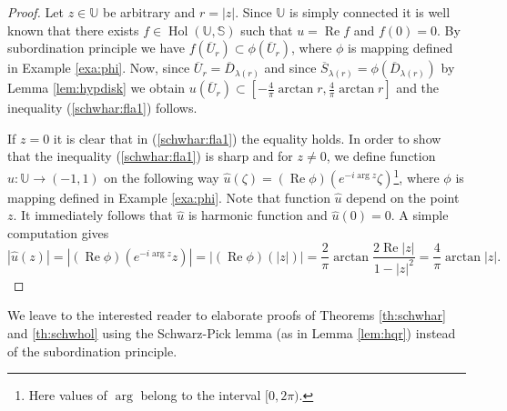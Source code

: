 \documentclass{amsart}
\newcommand{\re}{\mathop{\mathrm{Re}}}
\newcommand{\Hol}{\mathop{\mathrm{Hol}}}
\begin{document}
\begin{proof}
Let $z\in\mathbb{U}$ be arbitrary and $r=|z|$. Since $\mathbb{U}$ is simply connected it is well known that there exists $f\in\Hol(\mathbb{U},\mathbb{S})$ such that $u=\re{f}$ and $f(0)=0$. By subordination principle we have $f(\overline{U}_r)\subset\phi(\overline{U}_r)$, where $\phi$ is mapping defined in Example \ref{exa:phi}. Now, since
$\overline{U}_r=\overline{D}_{\lambda(r)}$ and since $\overline{S}_{\lambda(r)}=\phi(\overline{D}_{\lambda(r)})$  by Lemma \ref{lem:hypdisk} we obtain
$u(\overline{U}_r)\subset\displaystyle\left[-\frac{4}{\pi}\arctan{r},\frac{4}{\pi}\arctan{r}\right]$ and the inequality (\ref{schwhar:fla1}) follows.

If  $z=0$ it is clear  that in  (\ref{schwhar:fla1}) the equality holds.
In order to show that the inequality (\ref{schwhar:fla1}) is sharp and for  $z\neq0$, we  define  function  $\widehat{u}:\mathbb{U}\rightarrow(-1,1)$ on the following way $\widehat{u}(\zeta)=(\re{\phi})(e^{-i\arg{z}}\zeta)$\footnote{Here values of $\arg$ belong to the interval $\displaystyle[0,2\pi)$.}, where  $\phi$ is mapping defined in Example \ref{exa:phi}. Note that function $\widehat{u}$ depend on the point $z$. It immediately  follows that $\widehat{u}$ is harmonic function and  $\widehat{u}(0)=0$. A simple computation gives
\begin{equation*}
    |\widehat{u}(z)|=|(\re{\phi})(e^{-i\arg{z}}z)|=|(\re{\phi})(|z|)|=\frac{2}{\pi}\arctan{\frac{2\re|z|}{1-|z|^2}}=\frac{4}{\pi}\arctan{|z|}.
\end{equation*}
%
\end{proof}
We leave   to the interested  reader  to elaborate  proofs of Theorems \ref{th:schwhar} and \ref{th:schwhol}  using  the  Schwarz-Pick lemma (as in Lemma \ref{lem:hqr})  instead of the subordination principle.
\end{document}
